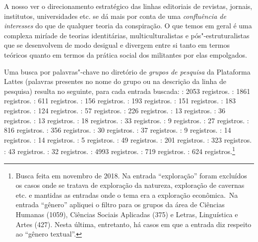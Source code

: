 A nosso ver o direcionamento estratégico das linhas editoriais de
revistas, jornais, institutos, universidades etc. se dá mais por conta
de uma \emph{confluência de interesses} do que de qualquer teoria da
conspiração. O que temos em geral é uma complexa miríade de teorias
identitárias, multiculturalistas e pós"-estruturalistas que se
desenvolvem de modo desigual e divergem entre si tanto em termos
teóricos quanto em termos da prática social dos militantes por elas
empolgados.

Uma busca por palavras"-chave no diretório de \emph{grupos de pesquisa}
da Plataforma Lattes (palavras presentes no nome do grupo ou na
descrição da linha de pesquisa) resulta no seguinte, para cada entrada
buscada: : 2053 registros. : 1861 registros.
: 611 registros. : 156 registros. : 193 registros.
: 151 registros. : 183 registros. : 124
registros. : 57 registros. : 226 registros.
: 13 registros. : 36 registros. : 13
registros. : 18 registros. : 33 registros. : 9
registros. : 27 registros. : 816 registros. : 356
registros. : 30 registros. : 37 registros. : 9 registros.
: 14 registros. : 14 registros. : 5 registros.
: 49 registros. : 201 registros. : 323
registros. : 43 registros. : 32 registros. :
4993 registros. : 719 registros. : 624
registros.\footnote{Busca feita em novembro de 2018. Na entrada
  ``exploração'' foram excluídos os casos onde se tratava de exploração
  da natureza, exploração de cavernas etc. e mantidas as entradas onde o
  tema era a exploração econômica.~Na entrada ``gênero'' apliquei o
  filtro para os grupos da área de Ciências Humanas (1059), Ciências
  Sociais Aplicadas (375) e Letras, Linguística e Artes (427). Nesta
  última, entretanto, há casos em que a entrada diz respeito ao ``gênero
  textual''.}

